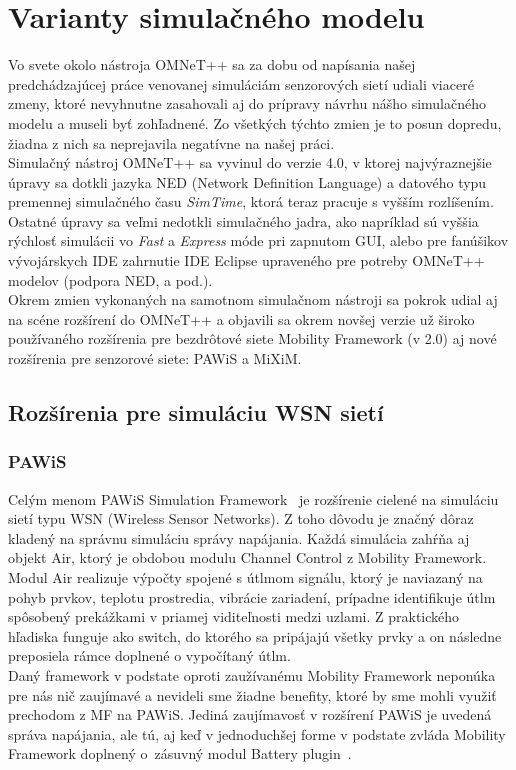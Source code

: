 \chapter{Varianty simulačného modelu}

\indent\indent Vo svete okolo nástroja OMNeT++ sa za dobu od napísania našej predchádzajúcej práce venovanej simuláciám senzorových sietí udiali viaceré zmeny, ktoré nevyhnutne zasahovali aj do prípravy návrhu nášho simulačného modelu a museli byť zohľadnené. Zo všetkých týchto zmien je to posun dopredu, žiadna z nich sa neprejavila negatívne na našej práci.\\
\indent Simulačný nástroj OMNeT++ sa vyvinul do verzie 4.0, v ktorej najvýraznejšie úpravy sa dotkli jazyka NED (Network Definition Language) a datového typu premennej simulačného času \textit{SimTime}, ktorá teraz pracuje s vyšším rozlíšením. Ostatné úpravy sa veľmi nedotkli simulačného jadra, ako napríklad sú vyššia rýchlosť simulácii vo \textit{Fast} a \textit{Express} móde pri zapnutom GUI, alebo pre fanúšikov vývojárskych IDE zahrnutie IDE Eclipse upraveného pre potreby OMNeT++ modelov (podpora NED, a pod.).\\
\indent Okrem zmien vykonaných na samotnom simulačnom nástroji sa pokrok udial aj na scéne rozšírení do OMNeT++ a objavili sa okrem novšej verzie už široko používaného rozšírenia pre bezdrôtové siete Mobility Framework (v 2.0) aj nové rozšírenia pre senzorové siete: PAWiS a MiXiM.\\

\section{Rozšírenia pre simuláciu WSN sietí}
\subsection{PAWiS}
\indent\indent Celým menom PAWiS Simulation Framework~\cite{pawis05} je rozšírenie cielené na simuláciu sietí typu WSN (Wireless Sensor Networks). Z toho dôvodu je značný dôraz kladený na správnu simuláciu správy napájania. Každá simulácia zahŕňa aj objekt \ttfamily Air\rmfamily, ktorý je obdobou modulu \ttfamily Channel Control \rmfamily z Mobility Framework. Modul \ttfamily Air \rmfamily realizuje výpočty spojené s útlmom signálu, ktorý je naviazaný na pohyb prvkov, teplotu prostredia, vibrácie zariadení, prípadne identifikuje útlm spôsobený prekážkami v priamej viditeľnosti medzi uzlami. Z praktického hľadiska funguje ako switch, do ktorého sa pripájajú všetky prvky a on následne preposiela rámce doplnené o vypočítaný útlm.\\
\indent Daný framework v podstate oproti zaužívanému Mobility Framework neponúka pre nás nič zaujímavé a nevideli sme žiadne benefity, ktoré by sme mohli využiť prechodom z MF na PAWiS. Jediná zaujímavosť v rozšírení PAWiS je uvedená správa napájania, ale tú, aj keď v jednoduchšej forme v podstate zvláda Mobility Framework doplnený o~zásuvný modul Battery plugin~\cite{forster08}.\\
